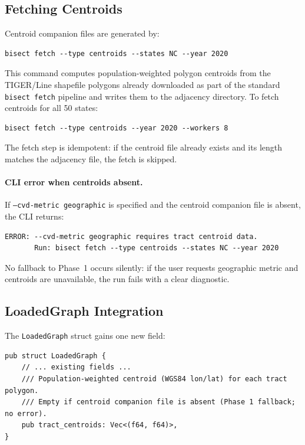 \subsection{Fetching Centroids}
\label{subsec:fetch}

Centroid companion files are generated by:

\begin{verbatim}
bisect fetch --type centroids --states NC --year 2020
\end{verbatim}

This command computes population-weighted polygon centroids from the
TIGER/Line shapefile polygons already downloaded as part of the standard
\texttt{bisect fetch} pipeline and writes them to the adjacency directory.
To fetch centroids for all 50 states:

\begin{verbatim}
bisect fetch --type centroids --year 2020 --workers 8
\end{verbatim}

The fetch step is idempotent: if the centroid file already exists and its
length matches the adjacency file, the fetch is skipped.

\paragraph{CLI error when centroids absent.}
If \texttt{--cvd-metric geographic} is specified and the centroid companion
file is absent, the CLI returns:

\begin{verbatim}
ERROR: --cvd-metric geographic requires tract centroid data.
       Run: bisect fetch --type centroids --states NC --year 2020
\end{verbatim}

No fallback to Phase~1 occurs silently: if the user requests geographic
metric and centroids are unavailable, the run fails with a clear diagnostic.

\subsection{LoadedGraph Integration}

The \texttt{LoadedGraph} struct gains one new field:

\begin{verbatim}
pub struct LoadedGraph {
    // ... existing fields ...
    /// Population-weighted centroid (WGS84 lon/lat) for each tract polygon.
    /// Empty if centroid companion file is absent (Phase 1 fallback; no error).
    pub tract_centroids: Vec<(f64, f64)>,
}
\end{verbatim}


